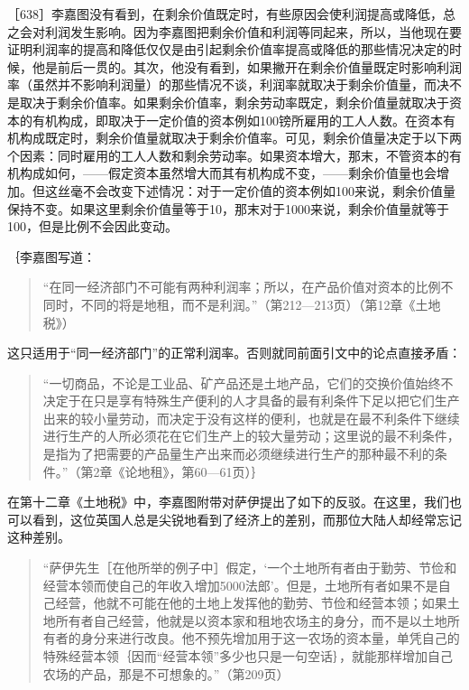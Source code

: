 ［638］李嘉图没有看到，在剩余价值既定时，有些原因会使利润提高或降低，总之会对利润发生影响。因为李嘉图把剩余价值和利润等同起来，所以，当他现在要证明利润率的提高和降低仅仅是由引起剩余价值率提高或降低的那些情况决定的时候，他是前后一贯的。其次，他没有看到，如果撇开在剩余价值量既定时影响利润率（虽然并不影响利润量）的那些情况不谈，利润率就取决于剩余价值量，而决不是取决于剩余价值率。如果剩余价值率，剩余劳动率既定，剩余价值量就取决于资本的有机构成，即取决于一定价值的资本例如100镑所雇用的工人人数。在资本有机构成既定时，剩余价值量就取决于剩余价值率。可见，剩余价值量决定于以下两个因素：同时雇用的工人人数和剩余劳动率。如果资本增大，那末，不管资本的有机构成如何，——假定资本虽然增大而其有机构成不变，——剩余价值量也会增加。但这丝毫不会改变下述情况：对于一定价值的资本例如100来说，剩余价值量保持不变。如果这里剩余价值量等于10，那末对于1000来说，剩余价值量就等于100，但是比例不会因此变动。

｛李嘉图写道：

\begin{quote}{“在同一经济部门不可能有两种利润率；所以，在产品价值对资本的比例不同时，不同的将是地租，而不是利润。”（第212—213页）（第12章《土地税》）}\end{quote}

这只适用于“同一经济部门”的正常利润率。否则就同前面引文中的论点直接矛盾：

\begin{quote}{“一切商品，不论是工业品、矿产品还是土地产品，它们的交换价值始终不决定于在只是享有特殊生产便利的人才具备的最有利条件下足以把它们生产出来的较小量劳动，而决定于没有这样的便利，也就是在最不利条件下继续进行生产的人所必须花在它们生产上的较大量劳动；这里说的最不利条件，是指为了把需要的产品量生产出来而必须继续进行生产的那种最不利的条件。”（第2章《论地租》，第60—61页）｝}\end{quote}

在第十二章《土地税》中，李嘉图附带对萨伊提出了如下的反驳。在这里，我们也可以看到，这位英国人总是尖锐地看到了经济上的差别，而那位大陆人却经常忘记这种差别。

\begin{quote}{“萨伊先生［在他所举的例子中］假定，‘一个土地所有者由于勤劳、节俭和经营本领而使自己的年收入增加5000法郎’。但是，土地所有者如果不是自己经营，他就不可能在他的土地上发挥他的勤劳、节俭和经营本领；如果土地所有者自己经营，他就是以资本家和租地农场主的身分，而不是以土地所有者的身分来进行改良。他不预先增加用于这一农场的资本量，单凭自己的特殊经营本领｛因而“经营本领”多少也只是一句空话｝，就能那样增加自己农场的产品，那是不可想象的。”（第209页）}\end{quote}

